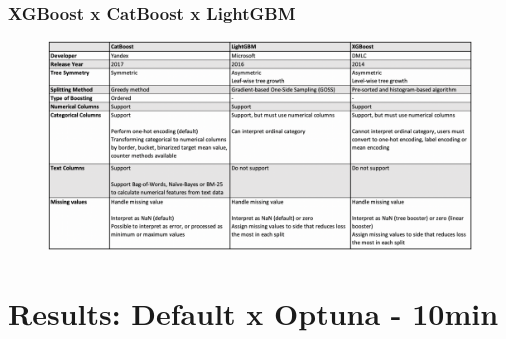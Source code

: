 \documentclass{beamer}
\begin{document}
\begin{frame}
\frametitle{XGBoost x CatBoost x LightGBM}
 \begin{figure}[h]
 \includegraphics[scale=0.23]{xgb_cat_ligt.png}
\end{figure}
\end{frame}
\section{Results: Default x Optuna - 10min}
\end{document}
